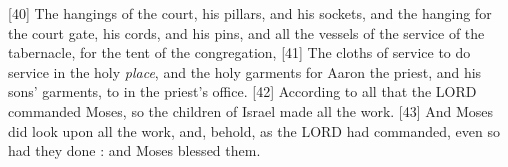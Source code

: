 [40] \textcolor[cmyk]{0.99998,1,0,0}{The hangings of the court, his pillars, and his sockets, and the hanging for the court gate, his cords, and his pins, and all the vessels of the service of the tabernacle, for the tent of the congregation,}
[41] \textcolor[cmyk]{0.99998,1,0,0}{The cloths of service to do service in the holy \emph{place}, and the holy garments for Aaron the priest, and his sons' garments, to  in the priest's office.}
[42] \textcolor[cmyk]{0.99998,1,0,0}{According to all that the LORD commanded Moses, so the children of Israel made all the work.}
[43] \textcolor[cmyk]{0.99998,1,0,0}{And Moses did look upon all the work, and, behold,  as the LORD had commanded, even so had they done : and Moses blessed them.}